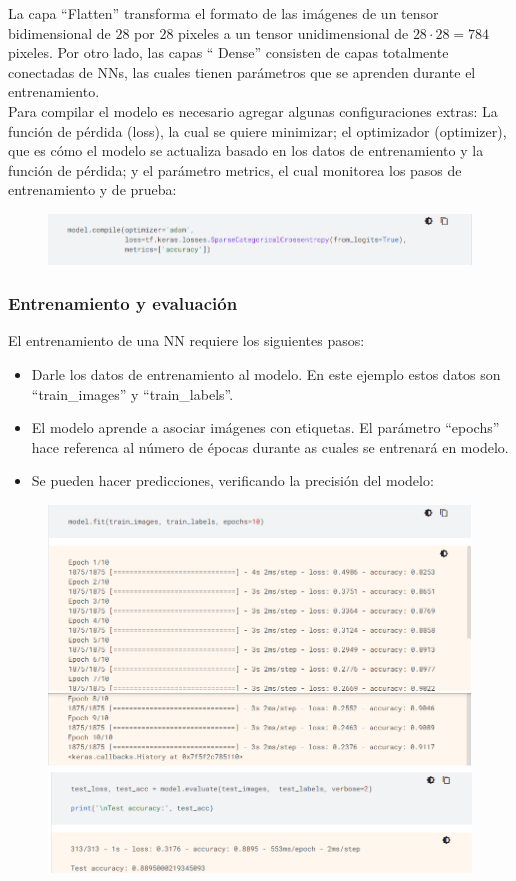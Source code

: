 \documentclass{article}
\begin{document}
La capa ``Flatten'' transforma el formato de las imágenes de un tensor bidimensional de $28$ por $28$ pixeles a un tensor unidimensional de $28\cdot 28= 784$ pixeles. Por otro lado, las capas `` Dense'' consisten de capas totalmente conectadas de NNs, las cuales tienen parámetros que se aprenden durante el entrenamiento.\\

Para compilar el modelo es necesario agregar algunas configuraciones extras: La función de pérdida (loss), la cual se quiere minimizar; el optimizador (optimizer), que es cómo el modelo se actualiza basado en los datos de entrenamiento y la función de pérdida; y el parámetro metrics, el cual monitorea los pasos de entrenamiento y de prueba:

\begin{figure}[th!]
   \includegraphics[width=\textwidth]{compile.png}
\end{figure}

\subsubsection{Entrenamiento y evaluación}
El entrenamiento de una NN requiere los siguientes pasos:
\begin{itemize}
    \item Darle los datos de entrenamiento al modelo. En este ejemplo estos datos son ``train\_images'' y ``train\_labels''.
    \item El modelo aprende a asociar imágenes con etiquetas. El parámetro ``epochs'' hace referenca al número de épocas durante as cuales se entrenará en modelo.
    \item Se pueden hacer predicciones, verificando la precisión del modelo:
    
\end{itemize}
\begin{figure}[th!]
   \includegraphics[width=\textwidth]{train.png}
\end{figure}
\end{document}
